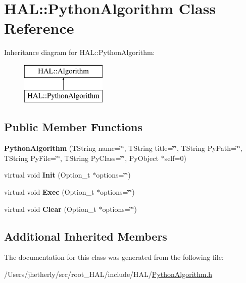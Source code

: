 \hypertarget{class_h_a_l_1_1_python_algorithm}{\section{H\+A\+L\+:\+:Python\+Algorithm Class Reference}
\label{class_h_a_l_1_1_python_algorithm}
}
Inheritance diagram for H\+A\+L\+:\+:Python\+Algorithm\+:\begin{figure}[H]
\begin{center}
\leavevmode
\includegraphics[height=2.000000cm]{class_h_a_l_1_1_python_algorithm}
\end{center}
\end{figure}
\subsection*{Public Member Functions}
\begin{DoxyCompactItemize}
\item 
\hypertarget{class_h_a_l_1_1_python_algorithm_a91ca9d7b2a002013b5dd27951aca3678}{{\bfseries Python\+Algorithm} (T\+String name=\char`\"{}\char`\"{}, T\+String title=\char`\"{}\char`\"{}, T\+String Py\+Path=\char`\"{}\char`\"{}, T\+String Py\+File=\char`\"{}\char`\"{}, T\+String Py\+Class=\char`\"{}\char`\"{}, Py\+Object $\ast$self=0)}\label{class_h_a_l_1_1_python_algorithm_a91ca9d7b2a002013b5dd27951aca3678}

\item 
\hypertarget{class_h_a_l_1_1_python_algorithm_a951c827d0f926b5096f7e59accc1e007}{virtual void {\bfseries Init} (Option\+\_\+t $\ast$options=\char`\"{}\char`\"{})}\label{class_h_a_l_1_1_python_algorithm_a951c827d0f926b5096f7e59accc1e007}

\item 
\hypertarget{class_h_a_l_1_1_python_algorithm_a64a70202dd5da390ab6654a7e33c5976}{virtual void {\bfseries Exec} (Option\+\_\+t $\ast$options=\char`\"{}\char`\"{})}\label{class_h_a_l_1_1_python_algorithm_a64a70202dd5da390ab6654a7e33c5976}

\item 
\hypertarget{class_h_a_l_1_1_python_algorithm_aac72e398eadd979cf62617fe2fbe1a01}{virtual void {\bfseries Clear} (Option\+\_\+t $\ast$options=\char`\"{}\char`\"{})}\label{class_h_a_l_1_1_python_algorithm_aac72e398eadd979cf62617fe2fbe1a01}

\end{DoxyCompactItemize}
\subsection*{Additional Inherited Members}


The documentation for this class was generated from the following file\+:\begin{DoxyCompactItemize}
\item 
/\+Users/jhetherly/src/root\+\_\+\+H\+A\+L/include/\+H\+A\+L/\hyperlink{_python_algorithm_8h}{Python\+Algorithm.\+h}\end{DoxyCompactItemize}
